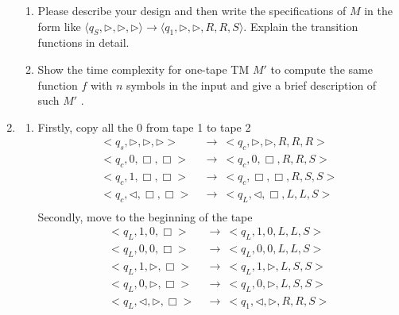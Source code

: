 \documentclass[12pt,a4paper]{article}
\makeatletter
\newtheorem*{solution}{Solution}
\theoremstyle{definition}
\renewenvironment{solution}[1][Solution] {\par\pushQED{\qed}\normalfont\topsep6\p@\@plus6\p@\relax\trivlist\item[\hskip\labelsep\bfseries#1\@addpunct{.}]\ignorespaces}{\popQED\endtrivlist\@endpefalse} \makeatother
\makeatother
\begin{document}
\begin{enumerate}
    \begin{enumerate}
	    \item
	    Please describe your design and then write the specifications of $M$ in the form like $\langle q_S, \triangleright, \triangleright, \triangleright \rangle \rightarrow \langle q_1, \triangleright,\triangleright,  R, R, S \rangle$. Explain the transition functions in detail.
	    
	    \item 
	    Show the time complexity for one-tape TM $M'$ to compute the same function $f$ with $n$ symbols in the input and give a brief description of such $M'$ .
	
	\end{enumerate}
	\begin{solution}
    \begin{enumerate}
        \item 
        Firstly, copy all the 0 from tape 1 to tape 2
        \begin{equation}
            \begin{aligned}
            <q_s,\triangleright,\triangleright,\triangleright> ~&\rightarrow~ <q_c,\triangleright,\triangleright,R,R,R>\\
            <q_c,0,\Box,\Box> ~&\rightarrow~ <q_c,0,\Box,R,R,S>\\
            <q_c,1,\Box,\Box> ~&\rightarrow~ <q_c,\Box,\Box,R,S,S>\\
            <q_c,\triangleleft,\Box,\Box> ~&\rightarrow~ <q_L,\triangleleft,\Box,L,L,S>\\
            \end{aligned}
        \end{equation}
        Secondly, move to the beginning of the tape
        \begin{equation}
            \begin{aligned}
            <q_L,1,0,\Box> ~&\rightarrow~ <q_L,1,0,L,L,S>\\
            <q_L,0,0,\Box> ~&\rightarrow~ <q_L,0,0,L,L,S>\\
            <q_L,1,\triangleright,\Box> ~&\rightarrow~ <q_L,1,\triangleright,L,S,S>\\
            <q_L,0,\triangleright,\Box> ~&\rightarrow~ <q_L,0,\triangleright,L,S,S>\\
            <q_L,\triangleleft,\triangleright,\Box> ~&\rightarrow~ <q_1,\triangleleft,\triangleright,R,R,S>\\
            \end{aligned}
        \end{equation}

\end{enumerate}
\end{solution}
\end{enumerate}
\end{document}
